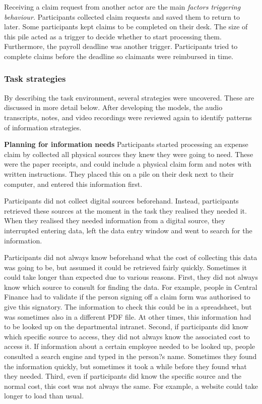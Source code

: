 Receiving a claim request from another actor are the main \textit{factors triggering behaviour.} Participants collected claim requests and saved them to return to later. Some participants kept claims to be completed on their desk. The size of this pile acted as a trigger to decide whether to start processing them. Furthermore, the payroll deadline was another trigger. Participants tried to complete claims before the deadline so claimants were reimbursed in time.

\subsubsection{Task strategies}
By describing the task environment, several strategies were uncovered. These are discussed in more detail below. After developing the models, the audio transcripts, notes, and video recordings were reviewed again to identify patterns of information strategies. 

\textbf{Planning for information needs}
Participants started processing an expense claim by collected all physical sources they knew they were going to need. These were the paper receipts, and could include a physical claim form and notes with written instructions. They placed this on a pile on their desk next to their computer, and entered this information first. 

Participants did not collect digital sources beforehand. Instead, participants retrieved these sources at the moment in the task they realised they needed it. When they realised they needed information from a digital source, they interrupted entering data, left the data entry window and went to search for the information. 

Participants did not always know beforehand what the cost of collecting this data was going to be, but assumed it could be retrieved fairly quickly. Sometimes it could take longer than expected due to various reasons. First, they did not always know which source to consult for finding the data. For example, people in Central Finance had to validate if the person signing off a claim form was authorised to give this signatory. The information to check this could be in a spreadsheet, but was sometimes also in a different PDF file. At other times, this information had to be looked up on the departmental intranet. Second, if participants did know which specific source to access, they did not always know the associated cost to access it. If information about a certain employee needed to be looked up, people consulted a search engine and typed in the person?s name. Sometimes they found the information quickly, but sometimes it took a while before they found what they needed. Third, even if participants did know the specific source and the normal cost, this cost was not always the same. For example, a website could take longer to load than usual.

